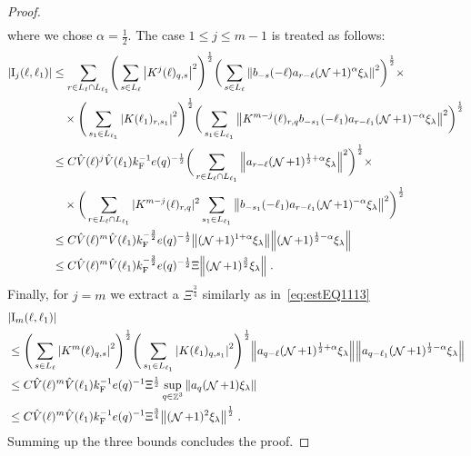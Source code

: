 \documentclass[12pt,a4paper]{article}
\numberwithin{equation}{section}
\newcommand{\1}{\mathbb{I}}
\newcommand{\F}{\mathrm{F}}
\newcommand{\I}{\mathrm{I}}
\DeclareMathOperator{\Z}{\mathbb{Z}}
\DeclareMathOperator{\NN}{\mathcal{N}}
\newcommand{\half}{\frac{1}{2}}
\theoremstyle{plain}
\theoremstyle{definition}
\theoremstyle{remark}
\theoremstyle{plain}
\theoremstyle{definition}
\theoremstyle{remark}
\begin{document}
\begin{proof}
\begin{align}
\end{align}
where we chose $\alpha = \half$. The case $ 1 \le j \le m-1 $ is treated as follows:
\begin{align}
	|\I_j(\ell, \ell_1)|
    &\leq \sum\limits_{r\in L_{\ell} \cap L_{\ell_1}}\! \Bigg( \sum\limits_{s \in L_\ell} \abs{K^{j}(\ell)_{q,s}}^2\Bigg)^\half \bigg( \sum\limits_{s \in L_\ell}\norm{  b_{-s}(-\ell) a_{r-\ell} (\NN+1)^{\alpha}\xi_\lambda}^2\bigg)^\half \times\nonumber\\
    		&\quad \times \Bigg( \sum\limits_{s_1 \in L_{\ell_1}}\abs{K(\ell_1)_{r,s_1}}^2\Bigg)^\half \bigg(\sum\limits_{s_1 \in L_{\ell_1}}\norm{ K^{m-j}(\ell)_{r,q}  b_{-s_1}(-\ell_1)  a_{r-\ell_1} (\NN+1)^{-\alpha}\xi_\lambda }^2\bigg)^\half
    \nonumber\\   
	&\leq C \hat{V}(\ell)^j \hat{V}(\ell_1) k_{\F}^{-1} e(q)^{-\half}
    \bigg( \sum\limits_{r\in L_{\ell} \cap L_{\ell_1}} \norm{ a_{r-\ell} (\NN+1)^{\half+\alpha}\xi_\lambda}^2\bigg)^\half \times \nonumber\\
		&\quad \times 
	\bigg(\sum\limits_{r\in L_{\ell} \cap L_{\ell_1}} |K^{m-j}(\ell)_{r,q} |^2
		\sum\limits_{s_1 \in L_{\ell_1}}\norm{ b_{-s_1}(-\ell_1)  a_{r-\ell_1} (\NN+1)^{-\alpha}\xi_\lambda }^2\bigg)^\half
	\nonumber\\
	&\leq  C \hat{V}(\ell)^m \hat{V}(\ell_1) k_{\F}^{-\frac 32} e(q)^{-\half}
	\norm{ (\NN+1)^{1+\alpha}\xi_\lambda}
	\norm{ (\NN+1)^{\half-\alpha}\xi_\lambda } \nonumber\\
	&\leq  C \hat{V}(\ell)^m \hat{V}(\ell_1) k_{\F}^{-\frac 32} e(q)^{-\half} \Xi
	\norm{ (\NN+1)^{\frac 32}\xi_\lambda } \;. \label{eq:estEQ2112}
\end{align}
Finally, for $ j = m $ we extract a $ \Xi^{\frac 34} $ similarly as in~\eqref{eq:estEQ1113}
\begin{align}
	&|\I_m(\ell, \ell_1)| \nonumber\\
	&\leq \Bigg(\sum\limits_{s \in L_{\ell}} \abs{K^m(\ell)_{q,s}}^2\Bigg)^\half
		\Bigg(\sum\limits_{s_1 \in L_{\ell_1}} \abs{K(\ell_1)_{q,s_1}}^2\Bigg)^\half
		\norm{ a_{q-\ell} (\NN+1)^{\half+\alpha}\xi_\lambda}
		\norm{ a_{q-\ell_1} (\NN+1)^{\half-\alpha} \xi_\lambda }\nonumber\\
	&\leq C \hat{V}(\ell)^m \hat{V}(\ell_1) k_{\F}^{-1} e(q)^{-1} \Xi^{\half}
		\sup_{q \in \Z^3} \norm{ a_q (\NN+1) \xi_\lambda }\nonumber\\
	&\leq C \hat{V}(\ell)^m \hat{V}(\ell_1) k_{\F}^{-1} e(q)^{-1} \Xi^{\frac 34}
		\norm{ (\NN+1)^2 \xi_\lambda }^{\half}\;. \label{eq:estEQ2113}
\end{align}
Summing up the three bounds concludes the proof.
\end{proof}
\end{document}
